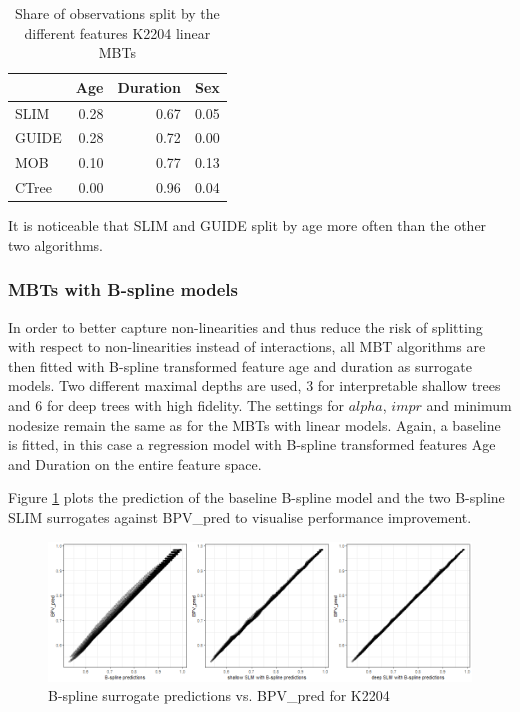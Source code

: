 \begin{table}[!htb]

\caption{Share of observations split by the different features K2204 linear MBTs}
\centering
\begin{tabular}[t]{l|r|r|r}
\hline
& Age & Duration & Sex\\
\hline
SLIM & 0.28 & 0.67 & 0.05\\
GUIDE & 0.28 & 0.72 & 0.00\\
MOB & 0.10 & 0.77 & 0.13\\
CTree & 0.00 & 0.96 & 0.04\\
\hline
\end{tabular}
\label{tab:ins_k2204_lm_surrogates_share}
\end{table}

It is noticeable that SLIM and GUIDE split by age more often than the other two algorithms.

\subsubsection{MBTs with B-spline models}

In order to better capture non-linearities and thus reduce the risk of splitting with respect to non-linearities instead of interactions, all MBT algorithms are then fitted with B-spline transformed feature age and duration as surrogate models. 
Two different maximal depths are used, 3 for interpretable shallow trees and 6 for deep trees with high fidelity. The settings for $alpha$, $impr$ and minimum nodesize remain the same as for the MBTs with linear models.  Again, a baseline is fitted, in this case a regression model with B-spline transformed features Age and Duration on the entire feature space. 

Figure \ref{fig:ins_k2204_fit} plots the prediction of the baseline B-spline model and the two B-spline SLIM surrogates against BPV\_pred to visualise performance improvement.

\begin{figure}[!htb]
    \centering    
    \includegraphics[width = 14cm]{Figures/insurance_use_case/k2204_BPV/fit.png}
    \caption{B-spline surrogate predictions vs. BPV\_pred for K2204}
    \label{fig:ins_k2204_fit}
\end{figure}

